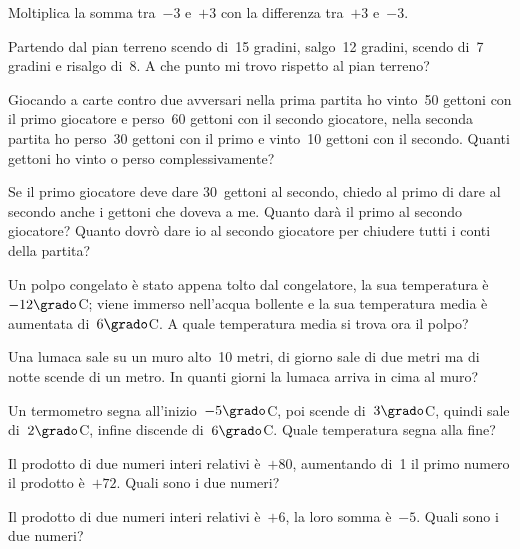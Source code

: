 \begin{multicols}{2}
\begin{esercizio}
 Moltiplica la somma tra~$-3$ e~$+3$ con la differenza tra~$+3$ e~$-3$.
\end{esercizio}

\begin{esercizio}
 Partendo dal pian terreno scendo di~15 gradini, salgo~12 gradini, scendo di~7
gradini e risalgo di~8. A che punto mi trovo rispetto al pian terreno?
\end{esercizio}

\begin{esercizio}[\Ast]
 Giocando a carte contro due avversari nella prima partita ho vinto~50 gettoni con il primo giocatore e perso~60
gettoni con il secondo giocatore, nella seconda partita ho perso~30 gettoni con il primo e vinto~10 gettoni
con il secondo. Quanti gettoni ho vinto o perso complessivamente?

Se il primo giocatore deve dare 30~gettoni al secondo, chiedo al primo di dare al secondo anche i gettoni che doveva a me. Quanto darà il primo al secondo giocatore? Quanto dovrò dare io al secondo giocatore per chiudere tutti i conti della partita?
\end{esercizio}

\begin{esercizio}[\Ast]
 Un polpo congelato è stato appena tolto dal congelatore, la sua temperatura è~$-12\grado$C;
viene immerso nell'acqua bollente e la sua temperatura media è aumentata di~$6\grado$C.
A quale temperatura media si trova ora il polpo?
\end{esercizio}

\begin{esercizio}
 Una lumaca sale su un muro alto~10 metri, di giorno sale di due metri ma di notte
scende di un metro. In quanti giorni la lumaca arriva in cima al muro?
\end{esercizio}

\begin{esercizio}[\Ast]
 Un termometro segna all'inizio~$-5\grado$C, poi scende di~$3\grado$C, quindi sale di~$2\grado$C,
infine discende di~$6\grado$C. Quale temperatura segna alla fine?
\end{esercizio}

\begin{esercizio}[\Ast]
 Il prodotto di due numeri interi relativi è~$+80$, aumentando di~1 il primo numero il
prodotto è~$+72$. Quali sono i due numeri?									
\end{esercizio}

\begin{esercizio}
 Il prodotto di due numeri interi relativi è~$+6$, la loro somma è~$-5$. Quali sono i due numeri?
\end{esercizio}



\end{multicols}
